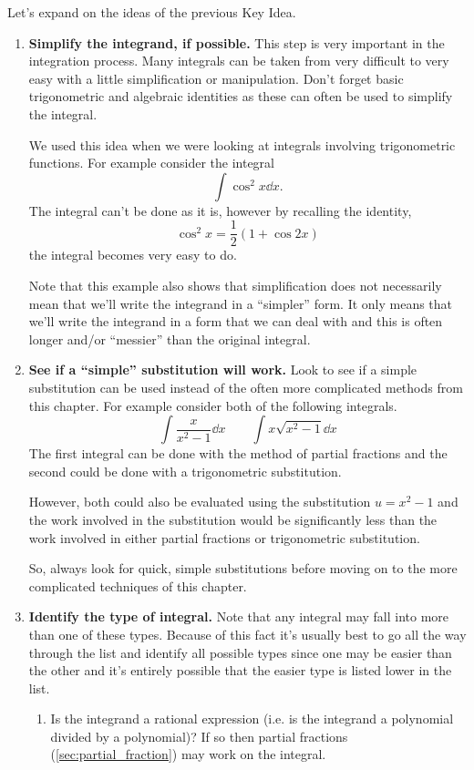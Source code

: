 Let's expand on the ideas of the previous Key Idea.
\begin{enumerate}
\item \textbf{Simplify the integrand, if possible.} This step is very important in the integration process. Many integrals can be taken from very difficult to very easy with a little simplification or manipulation. Don't forget basic trigonometric and algebraic identities as these can often be used to simplify the integral.

We used this idea when we were looking at integrals involving trigonometric functions. For example consider the integral
\[\int \cos^2 x\dd x.\]
The integral can't be done as it is, however by recalling the identity,
\[\cos^2 x = \frac{1}{2}(1 + \cos 2x)\]
the integral becomes very easy to do.

Note that this example also shows that simplification does not necessarily mean that we'll write the integrand in a ``simpler'' form. It only means that we'll write the integrand in a form that we can deal with and this is often longer and/or ``messier'' than the original integral.

\item \textbf{See if a ``simple'' substitution will work.} Look to see if a simple substitution can be used instead of the often more complicated methods from this chapter. For example consider both of the following integrals.
\[\int \frac{x}{x^2-1}\dd x \qquad \int x\sqrt{x^2 -1}\dd x\]
The first integral can be done with the method of partial fractions and the second could be done with a trigonometric substitution.

However, both could also be evaluated using the substitution $u=x^2 -1$ and the work involved in the substitution would be significantly less than the work involved in either partial fractions or trigonometric substitution.

So, always look for quick, simple substitutions before moving on to the more complicated techniques of this chapter.

\item \textbf{Identify the type of integral.} Note that any integral may fall into more than 
one of these types. Because of this fact it's usually best to go all the way through the list and identify all possible types since one may be easier than the other and it's entirely possible that the easier type is listed lower in the list.

\begin{enumerate}
\item Is the integrand a rational expression (i.e. is the integrand a polynomial divided by a polynomial)? If so then partial fractions (\autoref{sec:partial_fraction}) may work on the integral.


\end{enumerate}
\end{enumerate}
